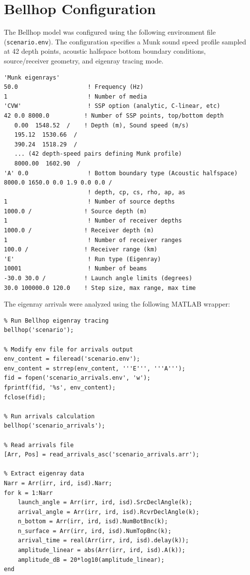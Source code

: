 \documentclass[fleqn]{jaes}
\begin{document}
\section{Bellhop Configuration}

The Bellhop model was configured using the following environment file (\texttt{scenario.env}). The configuration specifies a Munk sound speed profile sampled at 42 depth points, acoustic halfspace bottom boundary conditions, source/receiver geometry, and eigenray tracing mode.

\begin{verbatim}
'Munk eigenrays'
50.0                    ! Frequency (Hz)
1                       ! Number of media
'CVW'                   ! SSP option (analytic, C-linear, etc)
42 0.0 8000.0          ! Number of SSP points, top/bottom depth
   0.00  1548.52  /    ! Depth (m), Sound speed (m/s)
   195.12  1530.66  /
   390.24  1518.29  /
   ... (42 depth-speed pairs defining Munk profile)
   8000.00  1602.90  /
'A' 0.0                 ! Bottom boundary type (Acoustic halfspace)
8000.0 1650.0 0.0 1.9 0.0 0.0 /
                        ! depth, cp, cs, rho, ap, as
1                       ! Number of source depths
1000.0 /               ! Source depth (m)
1                       ! Number of receiver depths
1000.0 /               ! Receiver depth (m)
1                       ! Number of receiver ranges
100.0 /                ! Receiver range (km)
'E'                     ! Run type (Eigenray)
10001                   ! Number of beams
-30.0 30.0 /           ! Launch angle limits (degrees)
30.0 100000.0 120.0    ! Step size, max range, max time
\end{verbatim}

The eigenray arrivals were analyzed using the following MATLAB wrapper:

\begin{verbatim}
% Run Bellhop eigenray tracing
bellhop('scenario');

% Modify env file for arrivals output
env_content = fileread('scenario.env');
env_content = strrep(env_content, '''E''', '''A''');
fid = fopen('scenario_arrivals.env', 'w');
fprintf(fid, '%s', env_content);
fclose(fid);

% Run arrivals calculation
bellhop('scenario_arrivals');

% Read arrivals file
[Arr, Pos] = read_arrivals_asc('scenario_arrivals.arr');

% Extract eigenray data
Narr = Arr(irr, ird, isd).Narr;
for k = 1:Narr
    launch_angle = Arr(irr, ird, isd).SrcDeclAngle(k);
    arrival_angle = Arr(irr, ird, isd).RcvrDeclAngle(k);
    n_bottom = Arr(irr, ird, isd).NumBotBnc(k);
    n_surface = Arr(irr, ird, isd).NumTopBnc(k);
    arrival_time = real(Arr(irr, ird, isd).delay(k));
    amplitude_linear = abs(Arr(irr, ird, isd).A(k));
    amplitude_dB = 20*log10(amplitude_linear);
end
\end{verbatim}
\end{document}

